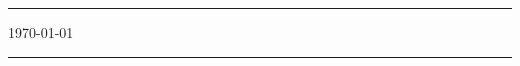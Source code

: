 \addCoverBg
\begin{center}
	{	
		\rule{\textwidth}{.5pt}   
		\vspace{0.2\textheight}  
		
		
		\vspace{0.1\textheight}  %
		
		
		{\songti \theAuthorName}
		
		\vfill
		{\large \today}
		
		\rule{\textwidth}{.5pt}
	}
\end{center}